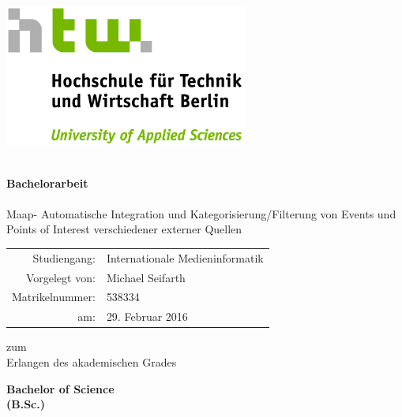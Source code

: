 \titlepage

\begin{center}
\includegraphics[width=8cm]{images/HTW_Logo_rgb.jpg}\vspace{0.5cm}
\par\end{center}

\noindent \begin{center}
\textsf{}\\
\textsf{\textbf{\huge Bachelorarbeit}}\\
\textsf{}\\
\textsf{\large Maap- Automatische Integration und Kategorisierung/Filterung von Events und Points of Interest verschiedener externer Quellen}
\par\end{center}{\Large \par}

\vspace{2cm}


\noindent \begin{center}
{\huge }\begin{tabular}{rl}
Studiengang: & Internationale Medieninformatik\tabularnewline
Vorgelegt von: & Michael Seifarth\tabularnewline
Matrikelnummer: & 538334\tabularnewline
am: & 29. Februar 2016\tabularnewline
\end{tabular}
\par\end{center}{\huge \par}

\vspace{1cm}


\noindent \begin{center}
zum \\
Erlangen des akademischen Grades\textsf{}\\
\textsf{\smallskip{}
}
\par\end{center}

\noindent \begin{center}
\textsf{\textbf{\huge Bachelor of Science}}\textsf{\textbf{\LARGE }}\\
\textsf{\textbf{(B.Sc.)}}
\par\end{center}

